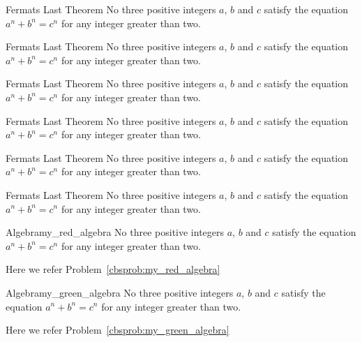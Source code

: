 \documentclass[11pt, letterpaper]{../exercise}
\begin{document}
    \begin{cbred}{Fermats Last Theorem}
    No three positive integers \(a\), \(b\) and \(c\) satisfy the equation
    \(a^{n} + b^{n} = c^{n}\) for any integer greater than two.
    \end{cbred}

    \begin{cbgreen}{Fermats Last Theorem}
    No three positive integers \(a\), \(b\) and \(c\) satisfy the equation
    \(a^{n} + b^{n} = c^{n}\) for any integer greater than two.
    \end{cbgreen}

    \begin{cbblue}{Fermats Last Theorem}
    No three positive integers \(a\), \(b\) and \(c\) satisfy the equation
    \(a^{n} + b^{n} = c^{n}\) for any integer greater than two.
    \end{cbblue}

    \begin{cbhoney}{Fermats Last Theorem}
    No three positive integers \(a\), \(b\) and \(c\) satisfy the equation
    \(a^{n} + b^{n} = c^{n}\) for any integer greater than two.
    \end{cbhoney}

    \begin{cbpink}{Fermats Last Theorem}
    No three positive integers \(a\), \(b\) and \(c\) satisfy the equation
    \(a^{n} + b^{n} = c^{n}\) for any integer greater than two.
    \end{cbpink}

    \begin{cbpurple}{Fermats Last Theorem}
    No three positive integers \(a\), \(b\) and \(c\) satisfy the equation
    \(a^{n} + b^{n} = c^{n}\) for any integer greater than two.
    \end{cbpurple}

    \begin{cbredproblem}{Algebra}{my_red_algebra}
    No three positive integers \(a\), \(b\) and \(c\) satisfy the equation
    \(a^{n} + b^{n} = c^{n}\) for any integer greater than two.
    \end{cbredproblem}
    Here we refer Problem~\ref{cbsprob:my_red_algebra}%

    \begin{cbgreenproblem}{Algebra}{my_green_algebra}
    No three positive integers \(a\), \(b\) and \(c\) satisfy the equation
    \(a^{n} + b^{n} = c^{n}\) for any integer greater than two.
    \end{cbgreenproblem}
    Here we refer Problem~\ref{cbsprob:my_green_algebra}%
\end{document}
